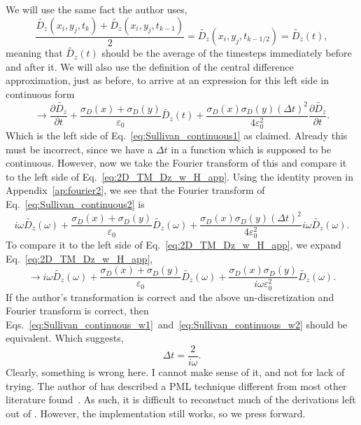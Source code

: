 \documentclass[12pt]{article}
\begin{document}
We will use the same fact the author uses,
\begin{equation}
\frac{\tilde{D_z}(x_i,y_j,t_k)+\tilde{D_z}(x_i,y_j,t_{k-1})}{2} = \tilde{D_z}(x_i,y_j,t_{k-1/2}) = \tilde{D_z}(t),
\end{equation}
meaning that $\tilde{D_z}(t)$ should be the average of the timesteps immediately before and after it. We will also use the definition of the central difference approximation, just as before, to arrive at an expression for this left side in continuous form
\begin{equation}
\label{eq:Sullivan_continuous2}
\rightarrow \frac{\partial\tilde{D_z}}{\partial t} + \frac{\sigma_D(x)+\sigma_D(y)}{\varepsilon_0}\tilde{D_z}(t) +\frac{\sigma_D(x)\sigma_D(y)\left(\Delta t\right)^2}{4\varepsilon_0^2}\frac{\partial \tilde{D_z}}{\partial t}.
\end{equation}
Which is the left side of Eq.~\ref{eq:Sullivan_continuous1} as claimed. Already this must be incorrect, since we have a $\Delta t$ in a function which is supposed to be continuous. However, now we take the Fourier transform of this and compare it to the left side of Eq.~\ref{eq:2D_TM_Dz_w_H_app}. Using the identity proven in Appendix~\ref{ap:fourier2}, we see that the Fourier transform of Eq.~\ref{eq:Sullivan_continuous2} is
\begin{equation}
\label{eq:Sullivan_continuous_w1}
i\omega\tilde{D_z}(\omega)+\frac{\sigma_D(x)+\sigma_D(y)}{\varepsilon_0}\tilde{D_z}(\omega) + \frac{\sigma_D(x)\sigma_D(y)\left(\Delta t\right)^2}{4\varepsilon_0^2}i\omega\tilde{D_z}(\omega).
\end{equation}
To compare it to the left side of Eq.~\ref{eq:2D_TM_Dz_w_H_app}, we expand Eq.~\ref{eq:2D_TM_Dz_w_H_app},
\begin{equation}
\label{eq:Sullivan_continuous_w2}
\rightarrow i\omega\tilde{D_z}(\omega)+\frac{\sigma_D(x)+\sigma_D(y)}{\varepsilon_0}\tilde{D_z}(\omega)+\frac{\sigma_D(x)\sigma_D(y)}{i\omega\varepsilon_0^2}\tilde{D_z}(\omega).
\end{equation}
If the author's transformation is correct and the above un-discretization and Fourier transform is correct, then Eqs.~\ref{eq:Sullivan_continuous_w1}~and~\ref{eq:Sullivan_continuous_w2} should be equivalent. Which suggests,
\begin{equation}
\Delta t = \frac{2}{i\omega}.
\end{equation}
Clearly, something is wrong here. I cannot make sense of it, and not for lack of trying. The author of \cite{Sullivan00} has described a PML technique different from most other literature found~\cite{Schneider10,Taflove00}. As such, it is difficult to reconstuct much of the derivations left out of \cite{Sullivan00}. However, the implementation still works, so we press forward.
\newpage
\end{document}

